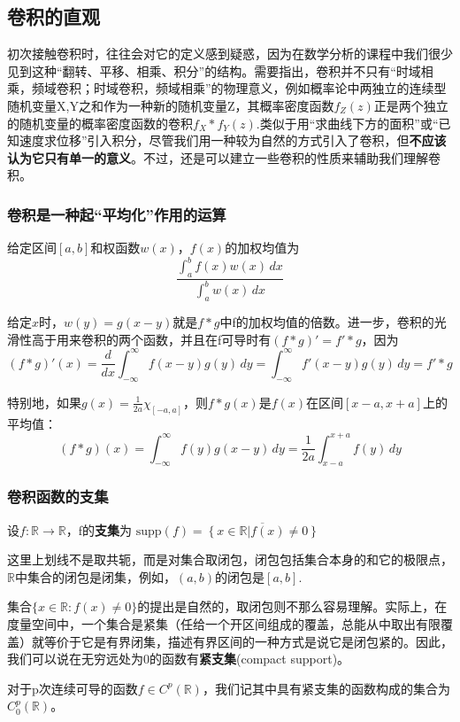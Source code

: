 \subsection{卷积的直观}\label{sub:intuition_of_convolution}
初次接触卷积时，往往会对它的定义感到疑惑，因为在数学分析的课程中我们很少见到这种“翻转、平移、相乘、积分”的结构。需要指出，卷积并不只有“时域相乘，频域卷积；时域卷积，频域相乘”的物理意义，例如概率论中两独立的连续型随机变量X,Y之和作为一种新的随机变量Z，其概率密度函数$f_Z(z)$正是两个独立的随机变量的概率密度函数的卷积$f_X*f_Y(z)$.类似于用“求曲线下方的面积”或“已知速度求位移”引入积分，尽管我们用一种较为自然的方式引入了卷积，但\textbf{不应该认为它只有单一的意义}。不过，还是可以建立一些卷积的性质来辅助我们理解卷积。

\subsubsection{卷积是一种起“平均化”作用的运算}
\begin{definition}[加权均值]
    给定区间$[a,b]$和权函数$w(x)$，$f(x)$的加权均值为\[\frac{\int_{a}^{b}f(x)w(x)\,dx}{\int_{a}^{b}w(x)\,dx}\]
\end{definition}
给定$x$时，$w(y)=g(x-y)$就是$f*g$中f的加权均值的倍数。进一步，卷积的光滑性高于用来卷积的两个函数，并且在f可导时有$(f*g)'=f'*g$，因为
\[(f*g)'(x)=\frac{d}{dx}\int_{-\infty}^{\infty}f(x-y)g(y)\,dy=\int_{-\infty}^{\infty}f'(x-y)g(y)\,dy=f'*g\]

特别地，如果$g(x)=\frac{1}{2a}\chi_{[-a,a]}$，则$f*g(x)$是$f(x)$在区间$[x-a,x+a]$上的平均值：
\[(f*g)(x)=\int_{-\infty}^{\infty}f(y)g(x-y)\,dy=\frac{1}{2a}\int_{x-a}^{x+a}f(y)\,dy\]

\subsubsection{卷积函数的支集}

\begin{definition}[支集]
    设$f:\mathbb{R}\to \mathbb{R}$，f的\textbf{支集}为
    $\mathrm{supp}(f)=\overline{\left\{x\in\mathbb{R}\left|f(x)\neq 0\right.\right\}}$
\end{definition}

这里上划线不是取共轭，而是对集合取闭包，闭包包括集合本身的和它的极限点，$\mathbb{R}$中集合的闭包是闭集，例如，$(a,b)$的闭包是$[a,b]$.

集合$\{x\in\mathbb{R}:f(x)\neq 0\}$的提出是自然的，取闭包则不那么容易理解。实际上，在度量空间中，一个集合是紧集（任给一个开区间组成的覆盖，总能从中取出有限覆盖）就等价于它是有界闭集，描述有界区间的一种方式是说它是闭包紧的。因此，我们可以说在无穷远处为0的函数有\textbf{紧支集}(compact support)。
\begin{definition}[紧支函数空间]
    对于p次连续可导的函数$f\in C^p(\mathbb{R})$，我们记其中具有紧支集的函数构成的集合为$C_0^p(\mathbb{R})$。
\end{definition}

